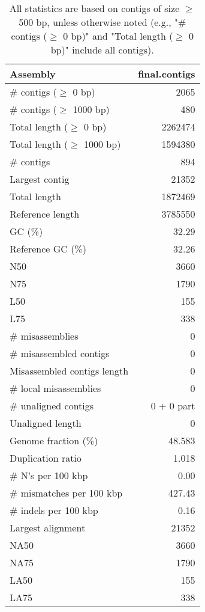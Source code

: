 \documentclass[12pt,a4paper]{article}
\begin{document}
\begin{table}[ht]
\begin{center}
\caption{All statistics are based on contigs of size $\geq$ 500 bp, unless otherwise noted (e.g., "\# contigs ($\geq$ 0 bp)" and "Total length ($\geq$ 0 bp)" include all contigs).}
\begin{tabular}{|l*{1}{|r}|}
\hline
Assembly & final.contigs \\ \hline
\# contigs ($\geq$ 0 bp) & 2065 \\ \hline
\# contigs ($\geq$ 1000 bp) & 480 \\ \hline
Total length ($\geq$ 0 bp) & 2262474 \\ \hline
Total length ($\geq$ 1000 bp) & 1594380 \\ \hline
\# contigs & 894 \\ \hline
Largest contig & 21352 \\ \hline
Total length & 1872469 \\ \hline
Reference length & 3785550 \\ \hline
GC (\%) & 32.29 \\ \hline
Reference GC (\%) & 32.26 \\ \hline
N50 & 3660 \\ \hline
N75 & 1790 \\ \hline
L50 & 155 \\ \hline
L75 & 338 \\ \hline
\# misassemblies & 0 \\ \hline
\# misassembled contigs & 0 \\ \hline
Misassembled contigs length & 0 \\ \hline
\# local misassemblies & 0 \\ \hline
\# unaligned contigs & 0 + 0 part \\ \hline
Unaligned length & 0 \\ \hline
Genome fraction (\%) & 48.583 \\ \hline
Duplication ratio & 1.018 \\ \hline
\# N's per 100 kbp & 0.00 \\ \hline
\# mismatches per 100 kbp & 427.43 \\ \hline
\# indels per 100 kbp & 0.16 \\ \hline
Largest alignment & 21352 \\ \hline
NA50 & 3660 \\ \hline
NA75 & 1790 \\ \hline
LA50 & 155 \\ \hline
LA75 & 338 \\ \hline
\end{tabular}
\end{center}
\end{table}
\end{document}
